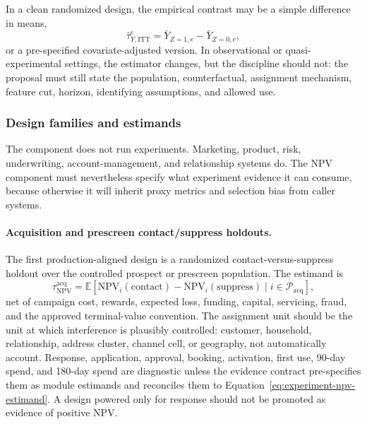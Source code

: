 \documentclass[11pt]{article}
\newcommand{\E}{\mathbb{E}}
\newcommand{\NPV}{\mathrm{NPV}}
\newcommand{\1}{\mathbf{1}}
\begin{document}
In a clean randomized design, the empirical contrast may be a simple
difference in means,
\begin{equation}
  \widehat{\tau}^{e}_{Y,\mathrm{ITT}}
  =
  \bar{Y}_{Z=1,e}-\bar{Y}_{Z=0,e},
  \label{eq:experiment-contrast}
\end{equation}
or a pre-specified covariate-adjusted version. In observational or
quasi-experimental settings, the estimator changes, but the discipline should
not: the proposal must still state the population, counterfactual, assignment
mechanism, feature cut, horizon, identifying assumptions, and allowed use.

\subsubsection{Design families and estimands}

The component does not run experiments. Marketing, product, risk,
underwriting, account-management, and relationship systems do. The NPV
component must nevertheless specify what experiment evidence it can consume,
because otherwise it will inherit proxy metrics and selection bias from caller
systems.

\paragraph{Acquisition and prescreen contact/suppress holdouts.}
The first production-aligned design is a randomized contact-versus-suppress
holdout over the controlled prospect or prescreen population. The estimand is
\begin{equation}
  \tau^{\mathrm{acq}}_{\NPV}
  =
  \E[\NPV_i(\mathrm{contact})-\NPV_i(\mathrm{suppress})
  \mid i\in\mathcal{P}_{\mathrm{acq}}],
  \label{eq:acq-holdout-estimand}
\end{equation}
net of campaign cost, rewards, expected loss, funding, capital, servicing,
fraud, and the approved terminal-value convention. The assignment unit should
be the unit at which interference is plausibly controlled: customer,
household, relationship, address cluster, channel cell, or geography, not
automatically account. Response, application, approval, booking, activation,
first use, 90-day spend, and 180-day spend are diagnostic unless the evidence
contract pre-specifies them as module estimands and reconciles them to
Equation~\eqref{eq:experiment-npv-estimand}. A design powered only for
response should not be promoted as evidence of positive NPV.
\end{document}

